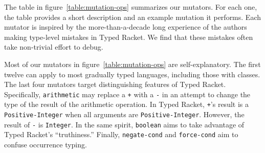 The table in figure~\ref{table:mutation-ops} summarizes our mutators.
For each one, the table provides a short description and an example
mutation it performs. Each mutator is inspired by the more-than-a-decade
long experience of the authors making type-level mistakes in Typed Racket.
We find that these mistakes often take non-trivial effort to debug.

Most of our mutators in figure~\ref{table:mutation-ops} are self-explanatory.
The first twelve can apply to most gradually typed languages, including those with classes.
The last four mutators target distinguishing features of Typed Racket.
Specifically, \texttt{arithmetic} may replace a \texttt{+} with a \texttt{-}
in an attempt to change the type of the result of the arithmetic
operation. In Typed Racket, \texttt{+}'s result is a
\texttt{Positive-Integer} when all arguments are
\texttt{Positive-Integer}. However, the result of \texttt{-} is
\texttt{Integer}. In the same spirit, \texttt{boolean} aims to take
advantage of Typed Racket's ``truthiness.'' Finally, \texttt{negate-cond} and \texttt{force-cond}
aim to confuse occurrence typing.


